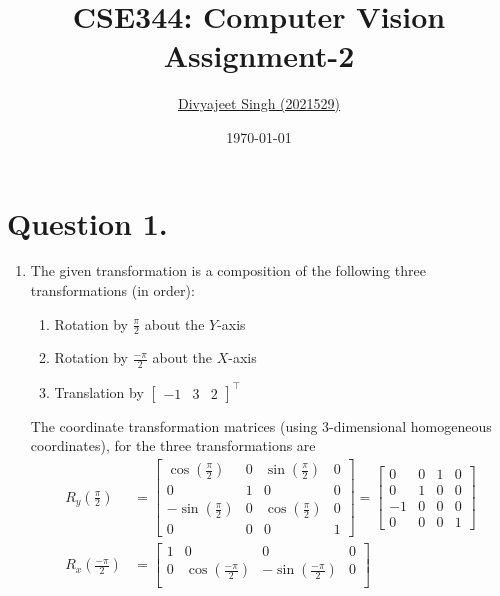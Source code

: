 \documentclass[10pt]{article}
\title{
    \textbf{CSE344: Computer Vision} \\ \vspace*{-5pt}
    \textbf{\large{Assignment-2}}
}
\author{\href{mailto:divyajeet21529@iiitd.ac.in}{Divyajeet Singh (2021529)}}
\date{\today}
\begin{document}
    \maketitle

    \section*{\textbf{Question 1.}}
    \begin{enumerate}
        \item The given transformation is a composition of the following three transformations
        (in order):
        \begin{enumerate}[label=(\alph*)]
            \item Rotation by $\frac{\pi}{2}$ about the $Y$-axis
            \item Rotation by $\frac{-\pi}{2}$ about the $X$-axis
            \item Translation by $\begin{bmatrix} -1 & 3 & 2 \end{bmatrix}^{\top}$
        \end{enumerate}
        The coordinate transformation matrices (using 3-dimensional homogeneous coordinates),
        for the three transformations are
        \begin{align*}
            R_{y}\left(\frac{\pi}{2}\right) &= \begin{bmatrix}
                \cos{\left(\frac{\pi}{2}\right)} & 0 & \sin{\left(\frac{\pi}{2}\right)} & 0 \\
                0 & 1 & 0 & 0 \\
                -\sin{\left(\frac{\pi}{2}\right)} & 0 & \cos{\left(\frac{\pi}{2}\right)} & 0 \\
                0 & 0 & 0 & 1
            \end{bmatrix} = \begin{bmatrix}
                0 & 0 & 1 & 0 \\
                0 & 1 & 0 & 0 \\
                -1 & 0 & 0 & 0 \\
                0 & 0 & 0 & 1
            \end{bmatrix} \\
            R_{x}\left(\frac{-\pi}{2}\right) &= \begin{bmatrix}
                1 & 0 & 0 & 0 \\
                0 & \cos{\left(\frac{-\pi}{2}\right)} & -\sin{\left(\frac{-\pi}{2}\right)} & 0 \\

\end{bmatrix}
\end{align*}
\end{enumerate}
\end{document}
